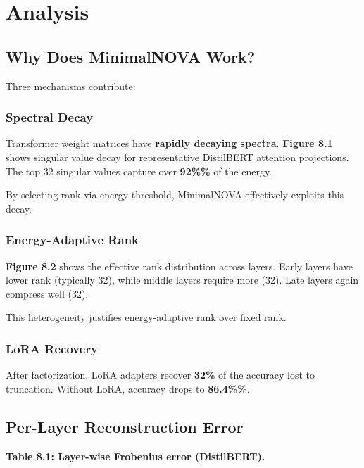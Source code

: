 
\section{Analysis}

\subsection{Why Does MinimalNOVA Work?}

Three mechanisms contribute:

\subsubsection{Spectral Decay}

Transformer weight matrices have \textbf{rapidly decaying spectra}. \textbf{Figure 8.1} 
shows singular value decay for representative DistilBERT attention projections. 
The top 32 singular values capture over \textbf{92\%\%} of the energy.

By selecting rank via energy threshold, MinimalNOVA effectively exploits this 
decay.

\subsubsection{Energy-Adaptive Rank}

\textbf{Figure 8.2} shows the effective rank distribution across layers. Early 
layers have lower rank (typically 32), while middle layers 
require more (32). Late layers again compress well (32).

This heterogeneity justifies energy-adaptive rank over fixed rank.

\subsubsection{LoRA Recovery}

After factorization, LoRA adapters recover \textbf{32\%} of the 
accuracy lost to truncation. Without LoRA, accuracy drops to 
\textbf{86.4\%\%}.

\subsection{Per-Layer Reconstruction Error}

\textbf{Table 8.1: Layer-wise Frobenius error (DistilBERT).}

